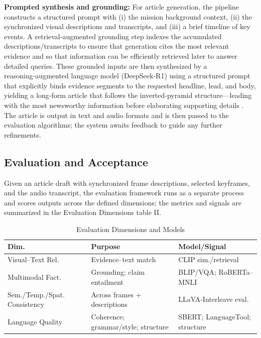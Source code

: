 \documentclass[letterpaper, 10 pt, conference]{ieeeconf}  %
\begin{document}
\textbf{Prompted synthesis and grounding:} For article generation, the pipeline constructs a structured prompt with (i) the mission background context, (ii) the synchronized visual descriptions and transcripts, and (iii) a brief timeline of key events. A retrieval‑augmented grounding step indexes the accumulated descriptions/transcripts to ensure that generation cites the most relevant evidence and so that information can be efficiently retrieved later to answer detailed queries. These grounded inputs are then synthesized by a reasoning‑augmented language model (DeepSeek‑R1) \cite{deepseekai2025deepseekr1incentivizingreasoningcapability} using a structured prompt that explicitly binds evidence segments to the requested headline, lead, and body, yielding a long‑form article that follows the inverted‑pyramid structure—leading with the most newsworthy information before elaborating supporting details \cite{herrero2024circular}. The article is output in text and audio formats and is then passed to the evaluation algorithms; the system awaits feedback to guide any further refinements.

\subsection{Evaluation and Acceptance}
Given an article draft with synchronized frame descriptions, selected keyframes, and the audio transcript, the evaluation framework runs as a separate process and scores outputs across the defined dimensions; the metrics and signals are summarized in the Evaluation Dimensions table II.

\begin{table}[!h]
\centering
\caption{Evaluation Dimensions and Models}
\label{tab:eval_summary}
\scriptsize
\setlength{\tabcolsep}{3pt}
\begin{tabular}{|l|p{2.1cm}|p{2.05cm}|}
\hline
\textbf{Dim.} & \textbf{Purpose} & \textbf{Model/Signal} \\
\hline
Visual–Text Rel. & Evidence–text match & CLIP sim./retrieval \\
\hline
Multimodal Fact. & Grounding; claim entailment & BLIP/VQA; RoBERTa--MNLI \\
\hline
Sem./Temp./Spat. Consistency & Across frames + descriptions & LLaVA-Interleave eval. \\
\hline
Language Quality & Coherence; grammar/style; structure & SBERT; LanguageTool; structure \\
\hline
\end{tabular}
\end{table}
\end{document}
